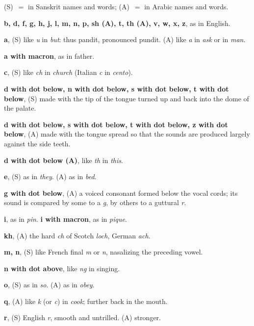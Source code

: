 \documentclass[11pt,a4paper]{article}
\begin{document}
(S)~$=$ in Sanskrit names and words; (A)~$=$ in Arabic names and words.

\medskip
\noindent\textbf{b, d, f, g, h, j, l, m, n, p, sh (A), t, th (A), v, w, x, z}, as in English.

\smallskip
\noindent\textbf{a}, (S) like \textit{u} in \textit{but}: thus pandit, pronounced pundit. (A) like \textit{a} in \textit{ask} or in \textit{man}.

\smallskip
\noindent\textbf{a with macron}, as in father.

\smallskip
\noindent\textbf{c}, (S) like \textit{ch} in \textit{church} (Italian \textit{c} in \textit{cento}).

\smallskip
\noindent\textbf{d with dot below, n with dot below, s with dot below, t with dot below}, (S) made with the tip of the tongue turned up and back into the dome of the palate.

\smallskip
\noindent\textbf{d with dot below, s with dot below, t with dot below, z with dot below}, (A) made with the tongue spread so that the sounds are produced largely against the side teeth.

\smallskip
\noindent\textbf{d with dot below (A)}, like \textit{th} in \textit{this}.

\smallskip
\noindent\textbf{e}, (S) as in \textit{they}. (A) as in \textit{bed}.

\smallskip
\noindent\textbf{g with dot below}, (A) a voiced consonant formed below the vocal cords; its sound is compared by some to a \textit{g}, by others to a guttural \textit{r}.

\smallskip
\noindent\textbf{i}, as in \textit{pin}. \textbf{i with macron}, as in \textit{pique}.

\smallskip
\noindent\textbf{kh}, (A) the hard \textit{ch} of Scotch \textit{loch}, German \textit{ach}.

\smallskip
\noindent\textbf{m, n}, (S) like French final \textit{m} or \textit{n}, nasalizing the preceding vowel.

\smallskip
\noindent\textbf{n with dot above}, like \textit{ng} in singing.

\smallskip
\noindent\textbf{o}, (S) as in \textit{so}. (A) as in \textit{obey}.

\smallskip
\noindent\textbf{q}, (A) like \textit{k} (or \textit{c}) in \textit{cook}; further back in the mouth.

\smallskip
\noindent\textbf{r}, (S) English \textit{r}, smooth and untrilled. (A) stronger.
\end{document}
